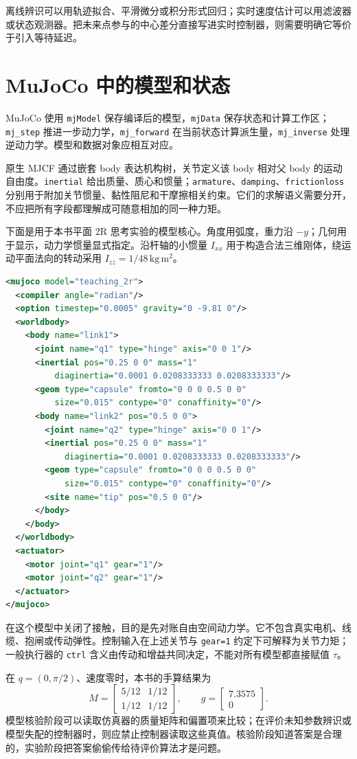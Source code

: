 离线辨识可以用轨迹拟合、平滑微分或积分形式回归；实时速度估计可以用滤波器或状态观测器。把未来点参与的中心差分直接写进实时控制器，则需要明确它等价于引入等待延迟。

\section{MuJoCo 中的模型和状态}

MuJoCo 使用 \texttt{mjModel} 保存编译后的模型，\texttt{mjData} 保存状态和计算工作区；\texttt{mj\_step} 推进一步动力学，\texttt{mj\_forward} 在当前状态计算派生量，\texttt{mj\_inverse} 处理逆动力学。模型和数据对象应相互对应。\cite{mujocosim}

原生 MJCF 通过嵌套 body 表达机构树，关节定义该 body 相对父 body 的运动自由度。\texttt{inertial} 给出质量、质心和惯量；\texttt{armature}、\texttt{damping}、\texttt{frictionloss} 分别用于附加关节惯量、黏性阻尼和干摩擦相关约束。它们的求解语义需要分开，不应把所有字段都理解成可随意相加的同一种力矩。\cite{mujocomodel}

下面是用于本书平面 2R 思考实验的模型核心。角度用弧度，重力沿 $-y$；几何用于显示，动力学惯量显式指定。沿杆轴的小惯量 $I_{xx}$ 用于构造合法三维刚体，绕运动平面法向的转动采用 $I_{zz}=1/48\,\mathrm{kg\,m^2}$。
\begin{lstlisting}[language=XML]
<mujoco model="teaching_2r">
  <compiler angle="radian"/>
  <option timestep="0.0005" gravity="0 -9.81 0"/>
  <worldbody>
    <body name="link1">
      <joint name="q1" type="hinge" axis="0 0 1"/>
      <inertial pos="0.25 0 0" mass="1"
          diaginertia="0.0001 0.0208333333 0.0208333333"/>
      <geom type="capsule" fromto="0 0 0 0.5 0 0"
          size="0.015" contype="0" conaffinity="0"/>
      <body name="link2" pos="0.5 0 0">
        <joint name="q2" type="hinge" axis="0 0 1"/>
        <inertial pos="0.25 0 0" mass="1"
            diaginertia="0.0001 0.0208333333 0.0208333333"/>
        <geom type="capsule" fromto="0 0 0 0.5 0 0"
            size="0.015" contype="0" conaffinity="0"/>
        <site name="tip" pos="0.5 0 0"/>
      </body>
    </body>
  </worldbody>
  <actuator>
    <motor joint="q1" gear="1"/>
    <motor joint="q2" gear="1"/>
  </actuator>
</mujoco>
\end{lstlisting}
在这个模型中关闭了接触，目的是先对账自由空间动力学。它不包含真实电机、线缆、抱闸或传动弹性。控制输入在上述关节与 \texttt{gear=1} 约定下可解释为关节力矩；一般执行器的 \texttt{ctrl} 含义由传动和增益共同决定，不能对所有模型都直接赋值 $\tau$。

在 $q=(0,\pi/2)$、速度零时，本书的手算结果为
\begin{equation}
M=\begin{bmatrix}5/12&1/12\\1/12&1/12\end{bmatrix},\qquad
g=\begin{bmatrix}7.3575\\0\end{bmatrix}.
\end{equation}
模型核验阶段可以读取仿真器的质量矩阵和偏置项来比较；在评价未知参数辨识或模型失配的控制器时，则应禁止控制器读取这些真值。核验阶段知道答案是合理的，实验阶段把答案偷偷传给待评价算法才是问题。

